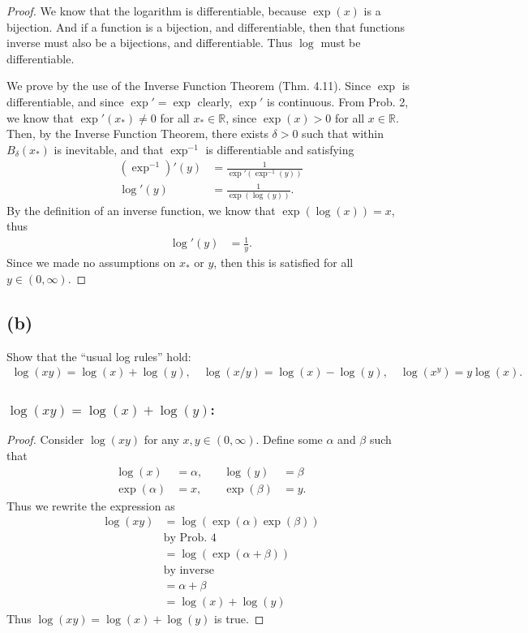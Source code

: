 \documentclass[12pt]{amsart}
\newcommand{\prob}[1]{Prob. #1}
\newcommand{\thm}[1]{Thm. #1}
\newcommand{\R}{\mathbb{R}}
\begin{document}
\begin{proof}
  We know that the logarithm is differentiable, because $\exp(x)$ is a
  bijection. And if a function is a bijection, and differentiable, then that
  functions inverse must also be a bijections, and differentiable. Thus $\log$
  must be differentiable.

  We prove by the use of the Inverse Function Theorem (\thm{4.11}). Since
  $\exp$ is differentiable, and since $\exp'=\exp$ clearly, $\exp'$ is
  continuous. From \prob{2}, we know that $\exp'(x_*)\neq 0$ for all $x_*\in\R$,
  since $\exp(x)>0$ for all $x\in\R$. Then, by the Inverse Function Theorem,
  there exists $\delta>0$ such that within $B_\delta(x_*)$ is inevitable, and
  that $\exp^{-1}$ is differentiable and satisfying
  \begin{align*}
    (\exp^{-1})'(y)&=\frac{1}{\exp'(\exp^{-1}(y))}\\
    \log'(y)&=\frac{1}{\exp(\log(y))}.
  \end{align*}
  By the definition of an inverse function, we know that $\exp(\log(x))=x$,
  thus
  \begin{align*}
    \log'(y)&=\frac{1}{y}.
  \end{align*}
  Since we made no assumptions on $x_*$ or $y$, then this is satisfied for all
  $y\in(0,\infty)$.
\end{proof}

\subsection*{(b)}%
\label{sub:_b_}

Show that the ``usual log rules'' hold:
\begin{align*}
  \log(xy)=\log(x)+\log(y),\quad
  \log(x/y)=\log(x)-\log(y),\quad
  \log(x^y)=y\log(x).
\end{align*}

\subsubsection*{$\log(xy)=\log(x)+\log(y)$:}%
\label{ssub:_log_xy_log_x_log_y_}

\begin{proof}
  Consider $\log(xy)$ for any $x,y\in(0,\infty)$. Define some $\alpha$ and
  $\beta$ such that
  \begin{align*}
    \log(x)&=\alpha,\quad&\log(y)&=\beta\\
    \exp(\alpha)&=x,\quad&\exp(\beta)&=y.
  \end{align*}
  Thus we rewrite the expression as
  \begin{align*}
    \log(xy)&=\log(\exp(\alpha)\exp(\beta))\\
            &\text{by \prob{4}}\\
            &=\log(\exp(\alpha+\beta))\\
            &\text{by inverse}\\
            &=\alpha+\beta\\
            &=\log(x)+\log(y)
  \end{align*}
  Thus $\log(xy)=\log(x)+\log(y)$ is true.
\end{proof}
\end{document}
